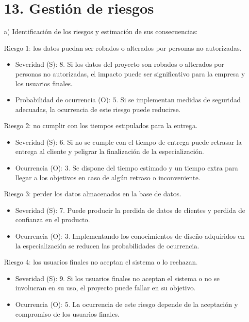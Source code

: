 \documentclass[
11pt, %
]{charter}
\begin{document}
\section{13. Gestión de riesgos}
\label{sec:riesgos}

a) Identificación de los riesgos y estimación de sus consecuencias:
 
Riesgo 1: los datos puedan ser robados o alterados por personas no autorizadas.
\begin{itemize}
	\item Severidad (S): 8. Si los datos del proyecto son robados o alterados por personas no autorizadas, el impacto puede ser significativo para la empresa y los usuarios finales.
	\item Probabilidad de ocurrencia (O): 5. Si se implementan medidas de seguridad adecuadas, la ocurrencia de este riesgo puede reducirse. 
\end{itemize}   

Riesgo 2: no cumplir con los tiempos estipulados para la entrega. 
\begin{itemize}
	\item Severidad (S): 6. Si no se cumple con el tiempo de entrega puede retrasar la entrega al cliente y peligrar la finalización de la especialización. 
	\item Ocurrencia (O): 3. Se dispone del tiempo estimado y un tiempo extra para llegar a los objetivos en caso de algún retraso o inconveniente. 
\end{itemize}

Riesgo 3: perder los datos almacenados en la base de datos.
\begin{itemize}
	\item Severidad (S): 7. Puede producir la perdida de datos de clientes y perdida de confianza en el producto.
	\item Ocurrencia (O): 3. Implementando los conocimientos de diseño adquiridos en la especialización se reducen las probabilidades de ocurrencia. 
\end{itemize}

Riesgo 4: los usuarios finales no aceptan el sistema o lo rechazan. 
\begin{itemize}
	\item Severidad (S): 9. Si los usuarios finales no aceptan el sistema o no se involucran en su uso, el proyecto puede fallar en su objetivo.
	\item Ocurrencia (O): 5. La ocurrencia de este riesgo depende de la aceptación y compromiso de los usuarios finales.
\end{itemize}
\end{document}
